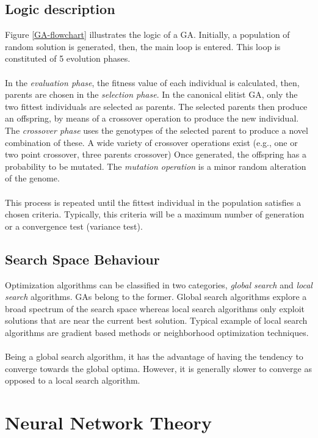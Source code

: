 \documentclass[a4paper,12pt, oneside]{memoir}
\begin{document}
\subsection{Logic description}

Figure \ref{GA-flowchart} illustrates the logic of a GA. Initially, a population of random solution is generated, then, the main loop is entered. This loop is constituted of 5 evolution phases. 
\\ \\
In the \textit{evaluation phase}, the fitness value of each individual is calculated, then, parents are chosen in the \textit{selection phase}. In the canonical elitist GA, only the two fittest individuals are selected as parents. The selected parents then produce an offspring, by means of a crossover operation to produce the new individual. The \textit{crossover phase} uses the genotypes of the selected parent to produce a novel combination of these. A wide variety of crossover operations exist (e.g., one or two point crossover, three parents crossover) Once generated, the offspring has a probability to be mutated. The \textit{mutation operation} is a minor random alteration of the genome.
\\ \\
This process is repeated until the fittest individual in the population satisfies a chosen criteria. Typically, this criteria will be a maximum number of generation or a convergence test (variance test).

\subsection{Search Space Behaviour}

Optimization algorithms can be classified in two categories, \textit{global search} and \textit{local search} algorithms. GAs belong to the former. Global search algorithms explore a broad spectrum of the search space whereas local search algorithms only exploit solutions that are near the current best solution. Typical example of local search algorithms are gradient based methods or neighborhood optimization techniques.
\\ \\ 
Being a global search algorithm, it has the advantage of having the tendency to converge towards the global optima. However, it is generally slower to converge as opposed to a local search algorithm.

\newpage

\section{Neural Network Theory}
\end{document}
